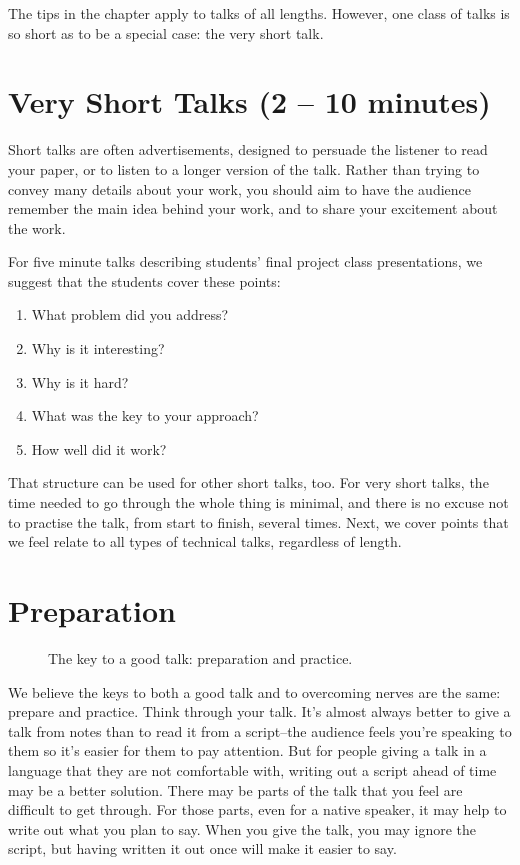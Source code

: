The tips in the chapter apply to talks of all lengths.  However, one class of talks is so short as to be a special case:  the very short talk.

\section{Very Short Talks (2 -- 10 minutes)}
Short talks are often advertisements, designed to persuade the listener to read your paper, or to listen to a longer version of the talk.  Rather than trying to convey many details about your work, you should aim to have the audience remember the main idea behind your work, and to share your excitement about the work.

For five minute talks describing students' final project class presentations, we suggest that the students cover these points:
\begin{enumerate}
\item What problem did you address?
\item Why is it interesting?
\item Why is it hard?
\item What was the key to your approach?
\item How well did it work?
\end{enumerate}
That structure can be used for other short talks, too.
For very short talks, the time needed to go through the whole thing is minimal, and there is no excuse not to practise the talk, from start to finish, several times.  Next, we cover points that we feel relate to all types of technical talks, regardless of length.


\section{Preparation}

\begin{figure}[htpb!]
\centerline{
}
\caption{The key to a good talk:  preparation and practice.}
\label{fig:speaker}
\end{figure}

\noindent We believe the keys to both a good talk and to overcoming nerves are the same: prepare and practice.  Think through your talk.  It's almost always better to give a talk from notes than to read it from a script--the audience feels  you're speaking to them so it's easier for them to pay attention.  But for people giving a talk in a language that they are not comfortable with, writing out a script ahead of time may be a better solution.  There may be parts of the talk that you feel are difficult to get through.  For those parts, even for a native speaker, it may help to write out what you plan to say.  When you give the talk, you may ignore the script, but having written it out once will make it easier to say.

